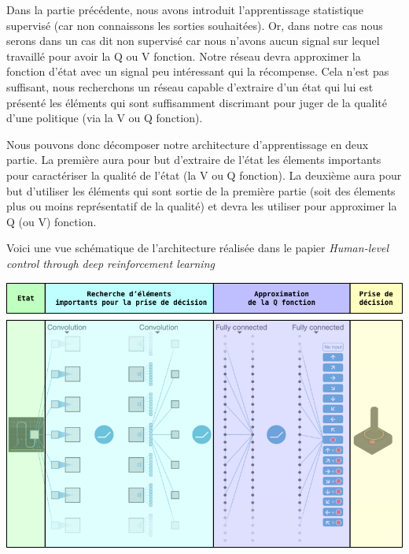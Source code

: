 Dans la partie précédente, nous avons introduit l'apprentissage statistique supervisé (car non connaissons les sorties souhaitées). Or, dans notre cas nous serons dans un cas dit non supervisé car nous n'avons aucun signal sur lequel travaillé pour avoir la Q ou V fonction. Notre réseau devra approximer la fonction d'état avec un signal peu intéressant qui la récompense. Cela n'est pas suffisant, nous recherchons un réseau capable d'extraire d'un état qui lui est présenté les éléments qui sont suffisamment discrimant pour juger de la qualité d'une politique (via la V ou Q fonction).


Nous pouvons donc décomposer notre architecture d'apprentissage en deux partie. La première aura pour but d'extraire de l'état les élements importants pour caractériser la qualité de l'état (la V ou Q fonction). La deuxième aura pour but d'utiliser les éléments qui sont sortie de la première partie (soit des élements plus ou moins représentatif de la qualité) et devra les utiliser pour approximer la Q (ou V) fonction.


Voici une vue schématique de l'architecture réalisée dans le papier \emph{Human-level control through deep reinforcement learning}\cite{mnih-dqn-2015}

\begin{center}
    \includegraphics[scale=.5]{./assets/DeepLearning/DP_EX.png}
\end{center}
